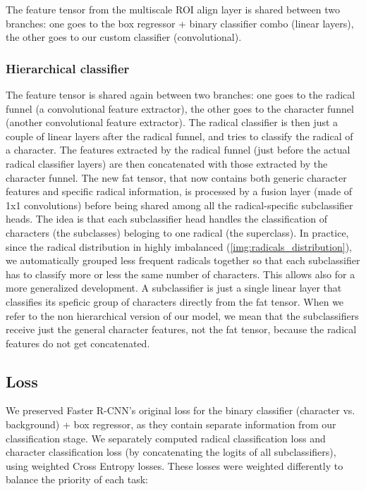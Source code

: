 The feature tensor from the multiscale ROI align layer is shared between two branches: one goes to the box regressor + binary classifier combo (linear layers), the other goes to our custom classifier (convolutional).

\subsubsection{Hierarchical classifier}

The feature tensor is shared again between two branches: one goes to the radical funnel (a convolutional feature extractor), the other goes to the character funnel (another convolutional feature extractor).
The radical classifier is then just a couple of linear layers after the radical funnel, and tries to classify the radical of a character.
The features extracted by the radical funnel (just before the actual radical classifier layers) are then concatenated with those extracted by the character funnel. The new fat tensor, that now contains both generic character features and specific radical information, is processed by a fusion layer (made of 1x1 convolutions) before being shared among all the radical-specific subclassifier heads. The idea is that each subclassifier head handles the classification of characters (the subclasses) beloging to one radical (the superclass). In practice, since the radical distribution in highly imbalanced (\ref{img:radicals_distribution}), we automatically grouped less frequent radicals together so that each subclassifier has to classify more or less the same number of characters. This allows also for a more generalized development. A subclassifier is just a single linear layer that classifies its speficic group of characters directly from the fat tensor.
When we refer to the non hierarchical version of our model, we mean that the subclassifiers receive just the general character features, not the fat tensor, because the radical features do not get concatenated.


\subsection{Loss}

We preserved Faster R-CNN’s original loss for the binary classifier (character vs. background) + box regressor, as they contain separate information from our classification stage.
We separately computed radical classification loss and character classification loss (by concatenating the logits of all subclassifiers), using weighted Cross Entropy losses. These losses were weighted differently to balance the priority of each task:

